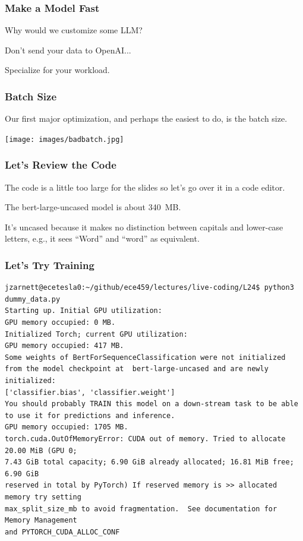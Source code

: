\begin{frame}
\frametitle{Make a Model Fast}

Why would we customize some LLM?

Don't send your data to OpenAI...

Specialize for your workload.

\end{frame}

\begin{frame}
\frametitle{Batch Size}

Our first major optimization, and perhaps the easiest to do, is the batch size.

\begin{center}
	\texttt{[image: images/badbatch.jpg]}
\end{center}


\end{frame}

\begin{frame}
\frametitle{Let's Review the Code}

The code is a little too large for the slides so let's go over it in a code editor.


The bert-large-uncased model is about 340~MB.

It's uncased because it makes no distinction between capitals and lower-case letters, e.g., it sees ``Word'' and ``word'' as equivalent.

\end{frame}

\begin{frame}[fragile]
\frametitle{Let's Try Training}

{\scriptsize
\begin{verbatim}
jzarnett@ecetesla0:~/github/ece459/lectures/live-coding/L24$ python3 dummy_data.py 
Starting up. Initial GPU utilization:
GPU memory occupied: 0 MB.
Initialized Torch; current GPU utilization:
GPU memory occupied: 417 MB.
Some weights of BertForSequenceClassification were not initialized 
from the model checkpoint at  bert-large-uncased and are newly initialized: 
['classifier.bias', 'classifier.weight']
You should probably TRAIN this model on a down-stream task to be able 
to use it for predictions and inference.
GPU memory occupied: 1705 MB.
torch.cuda.OutOfMemoryError: CUDA out of memory. Tried to allocate 20.00 MiB (GPU 0; 
7.43 GiB total capacity; 6.90 GiB already allocated; 16.81 MiB free; 6.90 GiB 
reserved in total by PyTorch) If reserved memory is >> allocated memory try setting 
max_split_size_mb to avoid fragmentation.  See documentation for Memory Management
and PYTORCH_CUDA_ALLOC_CONF
\end{verbatim}
}

\end{frame}

